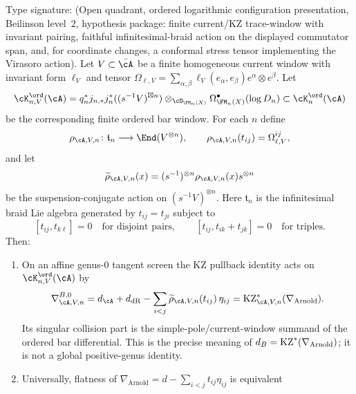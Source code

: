 \begin{theorem}
\label{thm:kz-arnold-pullback-genus-package}
Type signature: \textup{(}Open quadrant, ordered logarithmic
configuration presentation, Beilinson level~$2$, hypothesis package:
finite current/KZ trace-window with invariant pairing, faithful
infinitesimal-braid action on the displayed commutator span, and, for
coordinate changes, a conformal stress tensor implementing the Virasoro
action\textup{)}.
Let $V\subset\bar\cA$ be a finite homogeneous current window with
invariant form $\ell_V$ and tensor
$\Omega_{\ell,V}=\sum_{\alpha,\beta}\ell_V(e_\alpha,e_\beta)
e^\alpha\otimes e^\beta$. Let
\[
\cK^{\ord}_{n,V}(\cA)
=
q_n^*j_{n,*}j_n^*((s^{-1}V)^{\boxtimes n})
\otimes_{\cO_{\FM_n(X)}}
\Omega^\bullet_{\FM_n(X)}(\log D_n)
\subset \cK^{\ord}_n(\cA)
\]
be the corresponding finite ordered bar window. For each $n$ define
\begin{equation}\label{eq:kz-arnold-tn-representation}
\rho_{\cA,V,n}\colon\mathfrak t_n\longrightarrow
\End(V^{\otimes n}),
\qquad
\rho_{\cA,V,n}(t_{ij})=\Omega_{\ell,V}^{ij},
\end{equation}
and let
\begin{equation}\label{eq:kz-arnold-bar-suspension-action}
\widetilde\rho_{\cA,V,n}(x)
=(s^{-1})^{\otimes n}\rho_{\cA,V,n}(x)s^{\otimes n}
\end{equation}
be the suspension-conjugate action on \((s^{-1}V)^{\otimes n}\).
Here $\mathfrak t_n$ is the infinitesimal braid Lie algebra generated
by $t_{ij}=t_{ji}$ subject to
\[
[t_{ij},t_{k\ell}]=0\quad
\text{for disjoint pairs},\qquad
[t_{ij},t_{ik}+t_{jk}]=0\quad
\text{for triples}.
\]
Then:
\begin{enumerate}[label=\textup{(\roman*)}]
\item On an affine genus-$0$ tangent screen the KZ pullback identity
acts on \(\cK^{\ord}_{n,V}(\cA)\) by
\[
\nabla^{B,0}_{\cA,V,n}
=d_\cA+d_{\mathrm{dR}}
-\sum_{i<j}\widetilde\rho_{\cA,V,n}(t_{ij})\,\eta_{ij}
=\KZ_{\cA,V,n}^{*}(\nabla_{\mathrm{Arnold}}).
\label{eq:kz-arnold-bar-pullback-identity}
\]
Its singular collision part is the simple-pole/current-window summand
of the ordered bar differential. This is the precise meaning of
$d_B=\mathrm{KZ}^*(\nabla_{\mathrm{Arnold}})$; it is not a global
positive-genus identity.
\item Universally, flatness of
$\nabla_{\mathrm{Arnold}}=d-\sum_{i<j}t_{ij}\eta_{ij}$ is equivalent

\end{enumerate}
\end{theorem}
